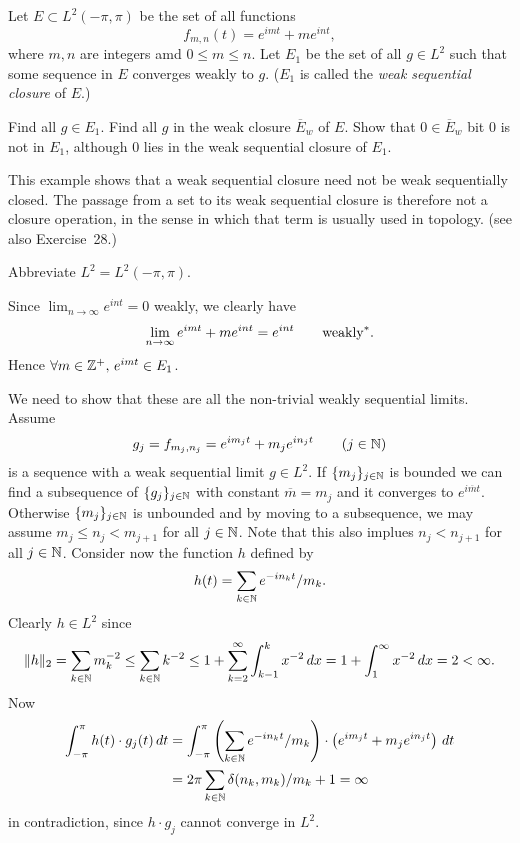 \begin{enumerate}
\begin{excopy}
Let  \(E \subset L^2(-\pi,\pi)\) be the set of all functions
\begin{equation*}
f_{m,n}(t) = e^{imt} + me^{int},
\end{equation*}
where \(m,n\) are integers amd \(0\leq m \leq n\). Let \(E_1\) be the set
of all \(g\in L^2\) such that some sequence in $E$ converges weakly to $g$.
(\(E_1\) is called the
\emph{weak sequential closure} of $E$.)
\begin{itemize}
 Find all \(g\in E_1\).
 Find all $g$ in the weak closure \(\overline{E}_w\) of $E$.
Show that \(0\in \overline{E}_w\) bit $0$ is not in \(E_1\),
although $0$ lies in the weak sequential closure of \(E_1\).
\end{itemize}
This example shows that a weak sequential closure need not be
weak sequentially closed. The passage from a set to its weak sequential
closure is therefore not a closure operation, in the sense in which that term
is usually used in topology. (see also Exercise~28.)
\end{excopy}

Abbreviate \(L^2 = L^2(-\pi,\pi)\).
\begin{itemize}
Since
\(\lim_{n\to\infty} e^{int} = 0\) weakly, we
clearly have
\begin{equation*}
\lim_{n\to\infty} e^{imt} + me^{int} = e^{int} \qquad\textnormal{weakly}^*.
\end{equation*}
Hence \(\forall m\in\mathbb{Z}^+,\,e^{imt} \in E_1\).

We need to show that these are all the non-trivial weakly sequential limits.
Assume
\begin{equation*}
g_j = f_{m_j,n_j} = e^{im_jt} + m_j e^{in_jt} \qquad (j\in\mathbb{N})
\end{equation*}
is a sequence with a weak sequential limit \(g\in L^2\).
If \(\{m_j\}_{j\in\mathbb{N}}\) is bounded we can find a subsequence
of \(\{g_j\}_{j\in\mathbb{N}}\) with constant \(\overline{m}=m_j\) and it converges
to \(e^{i\overline{m}t}\).
Otherwise \(\{m_j\}_{j\in\mathbb{N}}\) is unbounded and by moving to a subsequence,
we may assume \(m_j \leq n_j < m_{j+1}\) for all \(j\in\mathbb{N}\).
Note that this also implues \(n_j < n_{j+1}\) for all \(j\in\mathbb{N}\).
Consider now the
function $h$ defined by
\begin{equation*}
h(t) = \sum_{k\in\mathbb{N}} e^{-in_k t} / m_k.
\end{equation*}
Clearly \(h\in L^2\) since
\begin{equation*}
\|h\|_2 = \sum_{k\in\mathbb{N}} m_k^{-2} \leq \sum_{k\in\mathbb{N}} k^{-2}
\leq 1 + \sum_{k=2}^\infty \int_{k-1}^{k} x^{-2}\,dx
= 1 + \int_1^\infty x^{-2}\,dx = 2 < \infty.
\end{equation*}
Now
\begin{align*}
\int_{-\pi}^\pi h(t)\cdot g_j(t)\,dt
&= \int_{-\pi}^\pi \left(\sum_{k\in\mathbb{N}} e^{-in_k t} / m_k\right)
                \cdot \left(e^{im_jt} + m_j e^{in_jt}\right)\,dt
  \\
&= 2\pi \sum_{k\in\mathbb{N}} \delta(n_k,m_k)/m_k + 1 = \infty
\end{align*}
in contradiction, since \(h \cdot g_j\) cannot converge in \(L^2\).


\end{itemize}
\end{enumerate}
